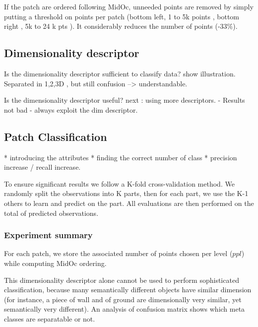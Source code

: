 		If the patch are ordered following MidOc, unneeded points are removed by simply putting a threshold on points per patch (bottom left, 1 to 5k points \per \cubic \meter , bottom right , 5k to 24 k pts \per \cubic \meter). It considerably reduces the number of points (-33\%). 
	
	\subsection{Dimensionality descriptor}
		\label{result.dim_descriptor}
		Is the dimensionality descriptor sufficient to classify data?
		show illustration.
		Separated in 1,2,3D , but still confusion
		--> understandable.
		
		Is the dimensionality descriptor useful?
		next : using more descriptors.
		  - Results not bad
		  - always exploit the dim descriptor.
		  
	\subsection{Patch Classification}
		\label{result.classification}
		
		* introducing the attributes
		* finding the correct number of class
		* precision increase / recall increase.
		
		
		To ensure significant results we follow a K-fold cross-validation method. 
		We randomly split the observations into K parts, then for each part, we use the K-1 others to learn and predict on the part.
		All evaluations are then performed on the total of predicted observations.
	
	
	\subsubsection{Experiment summary}
		For each patch, we store the associated number of points chosen per level ($ppl$) while computing MidOc ordering.  
	
		This dimensionality descriptor alone cannot be used to perform sophisticated classification, because many semantically different objects have similar dimension (for instance, a piece of wall and of ground are dimensionally very similar, yet semantically very different).
		An analysis of confusion matrix shows which meta classes are separatable or not.
		
